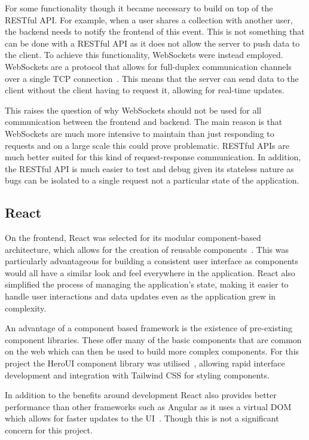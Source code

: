 For some functionality though it became necessary to build on top of the RESTful API. For example, when a user shares a collection with another user, the backend needs to notify the frontend of this event. This is not something that can be done with a RESTful API as it does not allow the server to push data to the client. To achieve this functionality, WebSockets were instead employed. WebSockets are a protocol that allows for full-duplex communication channels over a single TCP connection~\cite{WebSocket}. This means that the server can send data to the client without the client having to request it, allowing for real-time updates.

This raises the question of why WebSockets should not be used for all communication between the frontend and backend. The main reason is that WebSockets are much more intensive to maintain than just responding to requests and on a large scale this could prove problematic. RESTful APIs are much better suited for this kind of request-response communication. In addition, the RESTful API is much easier to test and debug given its stateless nature as bugs can be isolated to a single request not a particular state of the application.

\subsection{React}
On the frontend, React was selected for its modular component-based architecture, which allows for the creation of reusable components~\cite{10638895}. This was particularly advantageous for building a consistent user interface as components would all have a similar look and feel everywhere in the application. React also simplified the process of managing the application's state, making it easier to handle user interactions and data updates even as the application grew in complexity.

An advantage of a component based framework is the existence of pre-existing component libraries. These offer many of the basic components that are common on the web which can then be used to build more complex components. For this project the HeroUI component library was utilised~\cite{HeroUI}, allowing rapid interface development and integration with Tailwind CSS for styling components.

In addition to the benefits around development React also provides better performance than other frameworks such as Angular as it uses a virtual DOM which allows for faster updates to the UI~\cite{9959901}. Though this is not a significant concern for this project.

